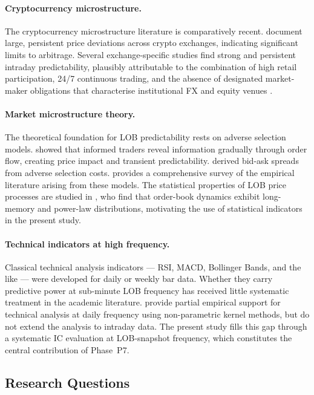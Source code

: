 \documentclass[12pt,a4paper]{article}
\theoremstyle{definition}
\theoremstyle{remark}
\begin{document}
\paragraph{Cryptocurrency microstructure.}
The cryptocurrency microstructure literature is comparatively recent.
\citet{makarov2020trading} document large, persistent price deviations
across crypto exchanges, indicating significant limits to arbitrage.
Several exchange-specific studies find strong and persistent
intraday predictability, plausibly attributable to the combination of
high retail participation, 24/7 continuous trading, and the absence of
designated market-maker obligations that characterise institutional
FX and equity venues \citep{bianchi2022trading}.

\paragraph{Market microstructure theory.}
The theoretical foundation for LOB predictability rests on adverse
selection models. \citet{kyle1985} showed that informed
traders reveal information gradually through order flow, creating
price impact and transient predictability. \citet{glosten1985}
derived bid-ask spreads from adverse selection costs.
\citet{madhavan2000market} provides a comprehensive survey of the
empirical literature arising from these models. The statistical
properties of LOB price processes are studied in \citet{bouchaud2002statistical},
who find that order-book dynamics exhibit long-memory and power-law
distributions, motivating the use of statistical indicators in the
present study.

\paragraph{Technical indicators at high frequency.}
Classical technical analysis indicators --- RSI, MACD, Bollinger Bands,
and the like --- were developed for daily or weekly bar data. Whether
they carry predictive power at sub-minute LOB frequency has received
little systematic treatment in the academic literature.
\citet{lo2000foundations} provide partial empirical support for
technical analysis at daily frequency using non-parametric kernel
methods, but do not extend the analysis to intraday data.
The present study fills this gap through a systematic IC evaluation
at LOB-snapshot frequency, which constitutes the central contribution
of Phase~P7.

\subsection{Research Questions}
\end{document}
